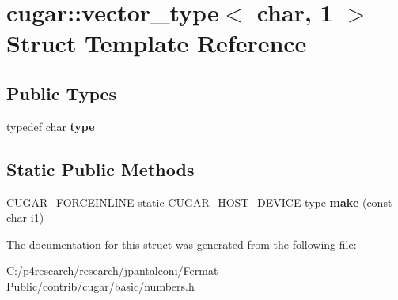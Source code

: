 \hypertarget{structcugar_1_1vector__type_3_01char_00_011_01_4}{}\section{cugar\+:\+:vector\+\_\+type$<$ char, 1 $>$ Struct Template Reference}
\label{structcugar_1_1vector__type_3_01char_00_011_01_4}
\subsection*{Public Types}
\begin{DoxyCompactItemize}
\item 
\mbox{\label{structcugar_1_1vector__type_3_01char_00_011_01_4_af86fdd4addc9a36aa1dfeeac0a79a0a7}} 
typedef char {\bfseries type}
\end{DoxyCompactItemize}
\subsection*{Static Public Methods}
\begin{DoxyCompactItemize}
\item 
\mbox{\label{structcugar_1_1vector__type_3_01char_00_011_01_4_a08809b6b092b2f92c55140f0bfd5cbdf}} 
C\+U\+G\+A\+R\+\_\+\+F\+O\+R\+C\+E\+I\+N\+L\+I\+NE static C\+U\+G\+A\+R\+\_\+\+H\+O\+S\+T\+\_\+\+D\+E\+V\+I\+CE type {\bfseries make} (const char i1)
\end{DoxyCompactItemize}


The documentation for this struct was generated from the following file\+:\begin{DoxyCompactItemize}
\item 
C\+:/p4research/research/jpantaleoni/\+Fermat-\/\+Public/contrib/cugar/basic/numbers.\+h\end{DoxyCompactItemize}
